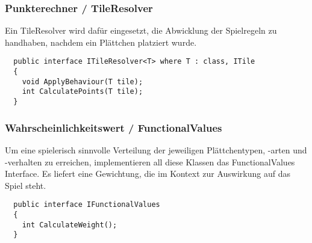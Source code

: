 \documentclass[../main.tex]{subfiles}
\begin{document}
	\subsubsection{Punkterechner / TileResolver}
	\par Ein TileResolver wird dafür eingesetzt, die Abwicklung der Spielregeln zu handhaben, nachdem ein Plättchen platziert wurde.
	\begin{lstlisting}
  public interface ITileResolver<T> where T : class, ITile
  {
	void ApplyBehaviour(T tile);
	int CalculatePoints(T tile);
  }
	\end{lstlisting}

	\subsubsection{Wahrscheinlichkeitswert / FunctionalValues}
	\par Um eine spielerisch sinnvolle Verteilung der jeweiligen Plättchentypen, -arten und -verhalten zu erreichen, implementieren all diese Klassen das FunctionalValues Interface. Es liefert eine Gewichtung, die im Kontext zur Auswirkung auf das Spiel steht.
	\begin{lstlisting}
  public interface IFunctionalValues
  {
	int CalculateWeight();
  }
	\end{lstlisting}
\end{document}
